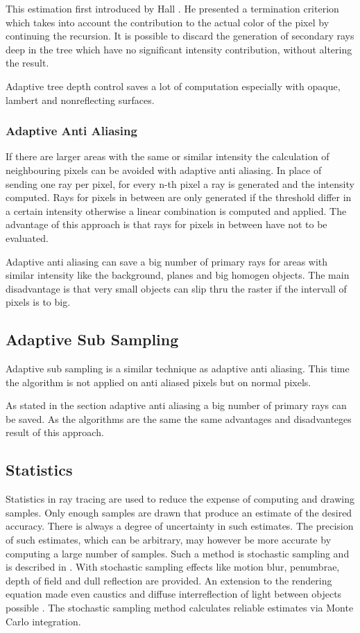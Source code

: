 \documentclass[DIV10, abstracton, openright, footsepline, headsepline, twoside, 9pt,
bigheadings]{scrreprt}
\begin{document}
This estimation first introduced by Hall \cite{HallTreeDepth83}. He presented
a termination criterion which takes into account the contribution to the actual
color of the pixel by continuing the recursion. It is possible to discard the
generation of secondary rays deep in the tree which have no significant
intensity contribution, without altering the result.

Adaptive tree depth control saves a lot of computation especially with opaque,
lambert and nonreflecting surfaces.

\subsubsection{Adaptive Anti Aliasing}
If there are larger areas with the same or similar intensity the calculation
of neighbouring pixels can be avoided with adaptive anti aliasing. In place of
sending one ray per pixel, for every n-th pixel a ray is generated and the
intensity computed. Rays for pixels in between are only generated if the
threshold differ in a certain intensity otherwise a linear combination is
computed and applied. The advantage of this approach is that rays for pixels in
between have not to be evaluated.

Adaptive anti aliasing can save a big number of primary rays for areas with
similar intensity like the background, planes and big homogen objects. The main
disadvantage is that very small objects can slip thru the raster if the
intervall of pixels is to big.

\subsection{Adaptive Sub Sampling}
Adaptive sub sampling is a similar technique as adaptive anti aliasing. This
time the algorithm is not applied on anti aliased pixels but on normal pixels.

As stated in the section adaptive anti aliasing a big number of primary rays can
be saved. As the algorithms are the same the same advantages and disadvanteges
result of this approach.

\subsection{Statistics}
Statistics in ray tracing are used to reduce the expense of computing and drawing
samples. Only enough samples are drawn that produce an estimate of the desired
accuracy. There is always a degree of uncertainty in such estimates. The
precision of such estimates, which can be arbitrary, may however be more accurate
by computing a large number of samples. Such a method is stochastic sampling and
is described in \cite{Cook86}. With stochastic sampling effects like motion blur,
penumbrae, depth of field and dull reflection are provided. An extension to the
rendering equation made even caustics and diffuse interreflection of light
between objects possible \cite{Kajiya86}.
The stochastic sampling method calculates reliable estimates via Monte Carlo
integration.
\end{document}
